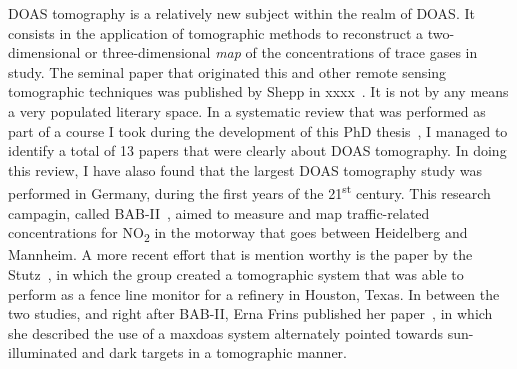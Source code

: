 DOAS tomography is a relatively new subject within the realm of
\gls{DOAS}. It consists in the application of tomographic methods to
reconstruct a two-dimensional or three-dimensional \emph{map} of the
concentrations of trace gases in study. The seminal paper that
originated this and other remote sensing tomographic techniques was
published by Shepp in xxxx~. It is not by any means a very populated
literary space. In a systematic review that was performed as part of a
course I took during the development of this PhD thesis~, I managed
to identify a total of 13 papers that were clearly about DOAS
tomography. In doing this review, I have alaso found that the largest
DOAS tomography study was performed in Germany, during the first years
of the 21\textsuperscript{st} century. This research campagin, called
BAB-II~\cite{Laepple2004}, aimed to measure and map traffic-related
concentrations for NO\textsubscript{2} in the motorway that goes between
Heidelberg and Mannheim. A more recent effort that is mention worthy is
the paper by the Stutz~\cite{Stutz2016}, in which the group created a
tomographic system that was able to perform as a fence  line monitor for
a refinery in Houston, Texas. In between the two studies, and right
after BAB-II, Erna Frins published her paper~\cite{Frins2006}, in which
she described the use of a \gls{maxdoas} system alternately pointed
towards sun-illuminated and dark targets in a tomographic manner.


